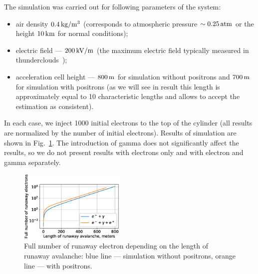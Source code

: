 \documentclass[doublecol,linenumbers]{epl2} %
\begin{document}
	The simulation was carried out for following parameters of the system:
	\begin{itemize}
		\item air density $0.4\un{kg/m^3}$ (corresponds to atmospheric pressure $\sim 0.25\un{atm}$ or the height $10\un{km}$ for normal conditions);
		\item electric field --- $200\un{kV/m}$ (the maximum electric field typically measured in thunderclouds~\cite{rakov_uman});
		\item acceleration cell height --- $800\un{m}$ for simulation without positrons and $700\un{m}$ for simulation with positrons (as we will see in result this length is approximately equal to 10 characteristic lengths and allows to accept the estimation as consistent).
	\end{itemize}
	
	In each case, we inject 1000 initial electrons to the top of the cylinder (all results are normalized by the number of initial electrons). Results of simulation are shown in Fig.~\ref{fig:sim}. The introduction of gamma does not significantly affect the results, so we do not present results with electrons only and with electron and gamma separately.
	
	\begin{figure}[h]
		\centering
		\includegraphics[width=0.45\textwidth]{figures/simulation.eps}
		\caption{Full number of runaway electron depending on the length of runaway avalanche: blue line --- simulation without positrons, orange line --- with positrons.}
		\label{fig:sim}
	\end{figure}
	
\end{document}
